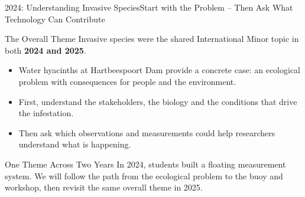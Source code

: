 \begin{frame}{2024: Understanding Invasive Species}{Start with the Problem -- Then Ask What Technology Can Contribute}
\begin{block}{The Overall Theme}
Invasive species were the shared International Minor topic in both \textbf{2024 and 2025}.
\end{block}
\begin{itemize}
\item Water hyacinths at Hartbeespoort Dam provide a concrete case: an ecological problem with consequences for people and the environment.
\item First, understand the stakeholders, the biology and the conditions that drive the infestation.
\item Then ask which observations and measurements could help researchers understand what is happening.
\end{itemize}
\begin{alertblock}{One Theme Across Two Years}
In 2024, students built a floating measurement system. We will follow the path from the ecological problem to the buoy and workshop, then revisit the same overall theme in 2025.
\end{alertblock}
\end{frame}
